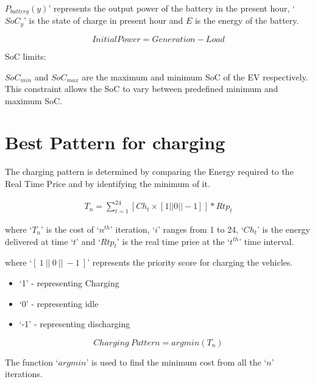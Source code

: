 	    $P_{battery}(y)$' represents the output power of the battery in the present hour, `$SoC_{y}$' is the state of charge in present hour and $E$ is the energy of the battery. 
		 
\begin{equation}             
	 Initial Power = Generation - Load
\end{equation}

	  SoC limits:  
	 
	   $SoC_{min}$ and $SoC_{max}$ are  the maximum and minimum SoC of the EV respectively.
	   This constraint allows the SoC to vary between predefined minimum and maximum SoC.               
	
	\section{Best Pattern for charging}
	\label{chap:best}
	
	The charging pattern is determined by comparing the Energy required to the Real Time Price and by  identifying the minimum of it. 
	
	\begin{equation}
		\begin{split}
				T_{n} = \sum_{t=1}^{24} [Ch_{t} \times [1 || 0 || -1 ] ] \ast  Rtp_{t} 
		\end{split}
		\label{eqn:bestpattern}
    \end{equation}	 

where `$T_{n}$' is the cost of `$n^{th}$' iteration, `$i$' ranges from 1 to 24, `$Ch_{t}$' is the energy delivered at time `$t$' and `$Rtp_{t}$' is the real time price at the `$t^{th}$' time interval.

\noindent where `$[ \ 1 \ ||\ 0 \ ||\ -1\ ]$' represents the priority score for charging the vehicles.

	\begin{itemize}
		\item `1' - representing Charging
		\item `0' - representing idle
		\item `-1' - representing discharging
	\end{itemize}

\begin{equation}
	Charging \ Pattern = argmin (T_{n})
	\label{eqn:argmin}
\end{equation}	

The function `$argmin$'  is used to find the minimum cost from all the `$n$' iterations.	

